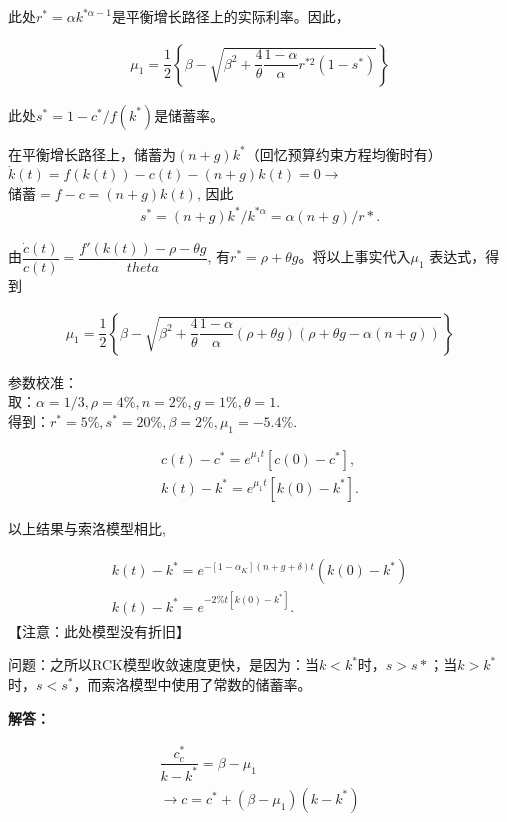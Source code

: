此处$ r^*=\alpha k^{*\alpha-1} $是平衡增长路径上的实际利率。因此，

\begin{align}
	\mu_1=\dfrac{1}{2}\left\{\beta-
	\sqrt{
		\beta^2+\dfrac{4}{\theta}
		\dfrac{1-\alpha}{\alpha}
		r^{*2}(1-s^*)
	}
	\right\}
\end{align}

此处$ s^*=1-c^*/f(k^*) $是储蓄率。


在平衡增长路径上，储蓄为$ (n+g)k^* $（回忆预算约束方程均衡时有）$ \dot{k}(t) =f(k(t))-c(t)-(n+g)k(t)=0$$ \rightarrow $$ \texttt{储蓄}=f-c=(n+g)k(t) $, 因此
\begin{gather*}
s^*=(n+g)k^*/ k^{*\alpha}=\alpha(n+g)/r*	.
\end{gather*}

由$  \dfrac{\dot{c}(t)}{c(t)}=\dfrac{f'(k(t))-\rho-\theta g}{theta}$, 有$ r^*=\rho+\theta g $。将以上事实代入$ \mu_1 $ 表达式，得到

\begin{align}
	\mu_1=\dfrac{1}{2}\left\{
	\beta-
	\sqrt{
	\beta^2+\dfrac{4}{\theta}\dfrac{1-\alpha}{\alpha}
	(\rho+\theta g)(\rho+\theta g-\alpha(n+g))
}
	\right\}
\end{align}

参数校准：\\

取：$ \alpha=1/3,\rho=4\%,n=2\%,g=1\%,\theta=1. $\\
得到：$ r^*=5\%, s^*=20\%, \beta=2\%,\mu_1=-5.4\%. $

\begin{align}
	c(t)-c^*=e^{\mu_1 t}[c(0)-c^*],
	\\
	k(t)-k^*=e^{\mu_1 t}[k(0)-k^*].
\end{align}

以上结果与索洛模型相比,

\begin{align}
	\begin{split}
	k(t)-k^*=e^{-[1-\alpha_K](n+g+\delta)t}\left(k(0)-k^*\right)
	\\
	k(t)-k^*=e^{-2\% t[k(0)-k^*]}.
	\end{split}
\end{align}
【注意：此处模型没有折旧】

问题：之所以RCK模型收敛速度更快，是因为：当$ k<k^* $时，$ s>s* $；当$ k>k^* $时，$ s<s^* $，而索洛模型中使用了常数的储蓄率。

\textbf{解答：}

\begin{align}
	\dfrac{c_c^*}{k-k^*}=\beta-\mu_1
	\\
	\rightarrow c=c^*+(\beta-\mu_1)(k-k^*)
\end{align}

